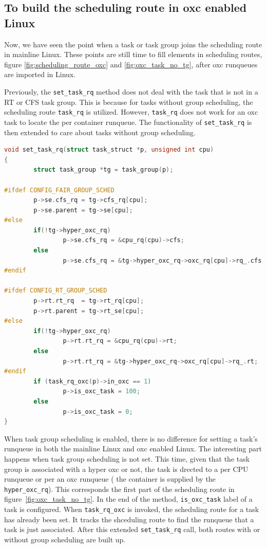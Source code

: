 \subsection{To build the scheduling route in oxc enabled Linux}

Now, we have seen the point when a task or task group joins the scheduling 
route in mainline Linux. These points are still time to fill elements in 
scheduling routes, figure \ref{fig:scheduling_route_oxc} and 
\ref{fig:oxc_task_no_tg}, after oxc runqueues are imported in Linux.

Previously, the \texttt{set\_task\_rq} method does not deal with the task 
that is not in a RT or CFS task group. This is because for tasks without 
group scheduling, the scheduling route \texttt{task\_rq} is utilized.
However, \texttt{task\_rq} does not work for an oxc task to locate the
per container runqueue. The functionality of \texttt{set\_task\_rq} is
then extended to care about tasks without group scheduling. 

\begin{lstlisting}[language=C, 
        caption={The extended \texttt{set\_task\_rq}}]
void set_task_rq(struct task_struct *p, unsigned int cpu)
{
        struct task_group *tg = task_group(p);

#ifdef CONFIG_FAIR_GROUP_SCHED
        p->se.cfs_rq = tg->cfs_rq[cpu];
        p->se.parent = tg->se[cpu];
#else
        if(!tg->hyper_oxc_rq)
                p->se.cfs_rq = &cpu_rq(cpu)->cfs;
        else
                p->se.cfs_rq = &tg->hyper_oxc_rq->oxc_rq[cpu]->rq_.cfs;
#endif

#ifdef CONFIG_RT_GROUP_SCHED
        p->rt.rt_rq  = tg->rt_rq[cpu];
        p->rt.parent = tg->rt_se[cpu];
#else
        if(!tg->hyper_oxc_rq)
                p->rt.rt_rq = &cpu_rq(cpu)->rt;
        else
                p->rt.rt_rq = &tg->hyper_oxc_rq->oxc_rq[cpu]->rq_.rt;
#endif
        if (task_rq_oxc(p)->in_oxc == 1)
                p->is_oxc_task = 100;
        else
                p->is_oxc_task = 0;
}
\end{lstlisting}
                                                  
When task group scheduling is enabled, there is no difference for setting a 
task's runqueue in both
the mainline Linux and oxc enabled Linux. The interesting part happens when 
task group scheduling is not set. This time, given that the task group is 
associated with a hyper oxc or not, the task is drected to a per CPU runqueue
or per an oxc runqueue ( the container is supplied by the 
\texttt{hyper\_oxc\_rq}). This corresponds the first part of the scheduling 
route in figure~\ref{fig:oxc_task_no_tg}. In the end of the method, 
\texttt{is\_oxc\_task} label of a task is configured. When 
\texttt{task\_rq\_oxc} is invoked, the scheduling route for a task has already 
been set. It tracks the shceduling route to find the runqueue that a task is 
just associated. After this extended \texttt{set\_task\_rq} call, both routes 
with or without group scheduling are built up.

